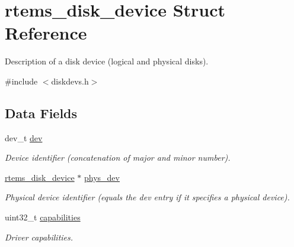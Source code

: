 \hypertarget{structrtems__disk__device}{}\section{rtems\+\_\+disk\+\_\+device Struct Reference}
\label{structrtems__disk__device}


Description of a disk device (logical and physical disks).  




{\ttfamily \#include $<$diskdevs.\+h$>$}

\subsection*{Data Fields}
\begin{DoxyCompactItemize}
\item 
\mbox{\label{structrtems__disk__device_a24cbd3856257a20e3e5ebf8496245177}} 
dev\+\_\+t \mbox{\hyperlink{structrtems__disk__device_a24cbd3856257a20e3e5ebf8496245177}{dev}}
\begin{DoxyCompactList}\small\item\em Device identifier (concatenation of major and minor number). \end{DoxyCompactList}\item 
\mbox{\label{structrtems__disk__device_a8c59fbc53e67fe7b972fb17cac278230}} 
\mbox{\hyperlink{structrtems__disk__device}{rtems\+\_\+disk\+\_\+device}} $\ast$ \mbox{\hyperlink{structrtems__disk__device_a8c59fbc53e67fe7b972fb17cac278230}{phys\+\_\+dev}}
\begin{DoxyCompactList}\small\item\em Physical device identifier (equals the {\ttfamily dev} entry if it specifies a physical device). \end{DoxyCompactList}\item 
\mbox{\label{structrtems__disk__device_a55d283185f3899c90aea5190f8cc76ee}} 
uint32\+\_\+t \mbox{\hyperlink{structrtems__disk__device_a55d283185f3899c90aea5190f8cc76ee}{capabilities}}
\begin{DoxyCompactList}\small\item\em Driver capabilities. \end{DoxyCompactList}\item 
\mbox{\label{structrtems__disk__device_ad4ab4464c9a9a32c253655a379fdfad2}} 

\end{DoxyCompactItemize}
